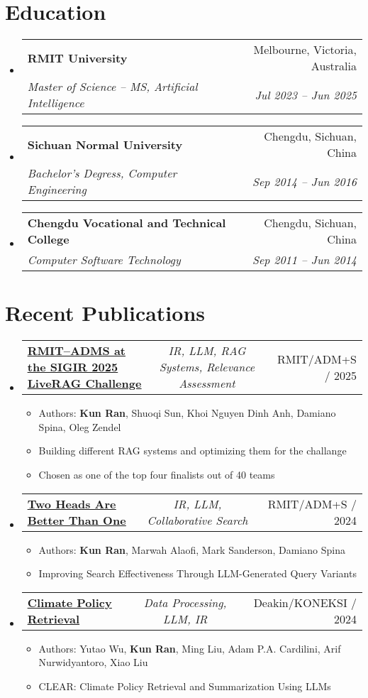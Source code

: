 \documentclass[a4paper,11pt]{article}
\makeatletter
\newcommand{\resumeItem}[1]{
  \item\small{#1}
}
\newcommand{\resumeItemListStart}{\begin{itemize}[rightmargin=0.11in]}
\newcommand{\resumeItemListEnd}{\end{itemize}}
\newcommand{\resumeTrioHeading}[3]{
  \item\small{
    \begin{tabular*}{0.96\textwidth}[t]{
      l@{\extracolsep{\fill}}c@{\extracolsep{\fill}}r
    }
      \textbf{#1} & \textit{#2} & #3
    \end{tabular*}
  }
}
\newcommand{\resumeQuadHeading}[4]{
  \item
  \begin{tabular*}{0.96\textwidth}[t]{l@{\extracolsep{\fill}}r}
    \textbf{#1} & #2 \\
    \textit{\small#3} & \textit{\small #4} \\
  \end{tabular*}
}
\newcommand{\resumeHeadingListStart}{
  \begin{itemize}[leftmargin=0.15in, label={}]
}
\newcommand{\resumeHeadingListEnd}{\end{itemize}}
\makeatother
\begin{document}
\section{Education}
  \resumeHeadingListStart{}
    \resumeQuadHeading{RMIT University}{Melbourne, Victoria, Australia}
    {Master of Science -- MS, Artificial Intelligence}{Jul 2023 -- Jun 2025}
    \resumeQuadHeading{Sichuan Normal University}{Chengdu, Sichuan, China}
    {Bachelor's Degress, Computer Engineering}{Sep 2014 -- Jun 2016}
    \resumeQuadHeading{Chengdu Vocational and Technical College}{Chengdu, Sichuan, China}
    {Computer Software Technology}{Sep 2011 -- Jun 2014}
  \resumeHeadingListEnd{}

\section{Recent Publications}
  \resumeHeadingListStart{}
    \resumeTrioHeading{\href{https://liverag.tii.ae/}{\uline{RMIT–ADMS at the SIGIR 2025 LiveRAG Challenge}}}{IR, LLM, RAG Systems, Relevance Assessment}{RMIT/ADM+S / 2025}
    \resumeItemListStart{}
      \resumeItem{Authors: \textbf{Kun Ran}, Shuoqi Sun, Khoi Nguyen Dinh Anh, Damiano Spina, Oleg Zendel}
      \resumeItem{Building different RAG systems and optimizing them for the challange}
      \resumeItem{Chosen as one of the top four finalists out of 40 teams}
    \resumeItemListEnd{}

    \resumeTrioHeading{\href{https://dl.acm.org/doi/10.1145/3698204.3716468}{\uline{Two Heads Are Better Than One}}}{IR, LLM, Collaborative Search}{RMIT/ADM+S / 2024}
    \resumeItemListStart{}
      \resumeItem{Authors: \textbf{Kun Ran}, Marwah Alaofi, Mark Sanderson, Damiano Spina}
      \resumeItem{Improving Search Effectiveness Through LLM-Generated Query Variants}
    \resumeItemListEnd{}

    \resumeTrioHeading{\href{https://counterinfodemic.org/}{\uline{Climate Policy Retrieval}}}{Data Processing, LLM, IR}{Deakin/KONEKSI / 2024}
    \resumeItemListStart{}
      \resumeItem{Authors: Yutao Wu, \textbf{Kun Ran}, Ming Liu, Adam P.A. Cardilini, Arif Nurwidyantoro, Xiao Liu}
      \resumeItem{CLEAR: Climate Policy Retrieval and Summarization Using LLMs}
    \resumeItemListEnd{}
  \resumeHeadingListEnd{}

\end{document}
